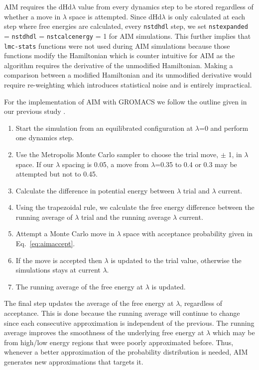 AIM requires the dHd$\lambda$ value from every dynamics step to be stored regardless of whether a move in $\lambda$ space is attempted. Since dHd$\lambda$ is only calculated at each step where free energies are calculated, every \texttt{nstdhdl} step, we set \texttt{nstexpanded} = \texttt{nstdhdl} = \texttt{nstcalcenergy} = 1 for AIM simulations. This further implies that \texttt{lmc-stats} functions were not used during AIM simulations because those functions modify the Hamiltonian which is counter intuitive for AIM as the algorithm requires the derivative of the unmodified Hamiltonian. Making a comparison between a modified Hamiltonian and its unmodified derivative would require re-weighting which introduces statistical noise and is entirely impractical.

For the implementation of AIM with GROMACS we follow the outline given in our previous study \cite{Ytreberg2006}. 
\begin{enumerate}
\item Start the simulation from an equilibrated configuration at $\lambda$=0 and perform one dynamics step. 
\item Use the Metropolis Monte Carlo sampler to choose the trial move, $\pm$ 1, in $\lambda$ space. If our $\lambda$ spacing is 0.05, a move from $\lambda$=0.35 to 0.4 or 0.3 may be attempted but not to 0.45. 
\item Calculate the difference in potential energy between $\lambda$ trial and $\lambda$ current.
\item Using the trapezoidal rule, we calculate the free energy difference between the running average of $\lambda$ trial and the running average $\lambda$ current. 
\item Attempt a Monte Carlo move in $\lambda$ space with acceptance probability given in Eq.\ \ref{eq:aimaccept}.
\item If the move is accepted then $\lambda$ is updated to the trial value, otherwise the simulations stays at current $\lambda$.
\item The running average of the free energy at $\lambda$ is updated.
\end{enumerate}

The final step updates the average of the free energy at $\lambda$, regardless of acceptance. This is done because the running average will continue to change since each consecutive approximation is independent of the previous. The running average improves the smoothness of the underlying free energy at $\lambda$ which may be from high/low energy regions that were poorly approximated before. Thus, whenever a better approximation of the probability distribution is needed, AIM generates new approximations that targets it. 

